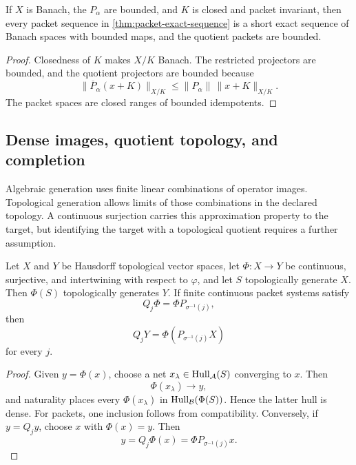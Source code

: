 \begin{corollary}
\label{cor:topological-packet-exact-sequence}
If $X$ is Banach, the $P_\alpha$ are bounded, and $K$ is closed and packet invariant, then every packet sequence in \cref{thm:packet-exact-sequence} is a short exact sequence of Banach spaces with bounded maps, and the quotient packets are bounded.
\end{corollary}

\begin{proof}
Closedness of $K$ makes $X/K$ Banach.  The restricted projectors are bounded, and the quotient projectors are bounded because
\[
\|\overline P_\alpha(x+K)\|_{X/K}
\leq
\|P_\alpha\|\,\|x+K\|_{X/K}.
\]
The packet spaces are closed ranges of bounded idempotents.
\end{proof}

\subsection{Dense images, quotient topology, and completion}
Algebraic generation uses finite linear combinations of operator images.  Topological generation allows limits of those combinations in the declared topology.  A continuous surjection carries this approximation property to the target, but identifying the target with a topological quotient requires a further assumption.

\begin{theorem}
\label{thm:dense-realization}
Let $X$ and $Y$ be Hausdorff topological vector spaces, let $\Phi:X\to Y$ be continuous, surjective, and intertwining with respect to $\varphi$, and let $S$ topologically generate $X$.  Then $\Phi(S)$ topologically generates $Y$.  If finite continuous packet systems satisfy
\[
Q_j\Phi=\Phi P_{\sigma^{-1}(j)},
\]
then
\[
\boxed{
Q_jY=\Phi(P_{\sigma^{-1}(j)}X)
}
\]
for every $j$.
\end{theorem}

\begin{proof}
Given $y=\Phi(x)$, choose a net $x_\lambda\in\operatorname{Hull}_{\mathcal A}(S)$ converging to $x$.  Then
\[
\Phi(x_\lambda)\to y,
\]
and naturality places every $\Phi(x_\lambda)$ in $\operatorname{Hull}_{\mathcal B}(\Phi(S))$.  Hence the latter hull is dense.  For packets, one inclusion follows from compatibility.  Conversely, if $y=Q_jy$, choose $x$ with $\Phi(x)=y$.  Then
\[
y=Q_j\Phi(x)=\Phi P_{\sigma^{-1}(j)}x.
\]
\end{proof}

